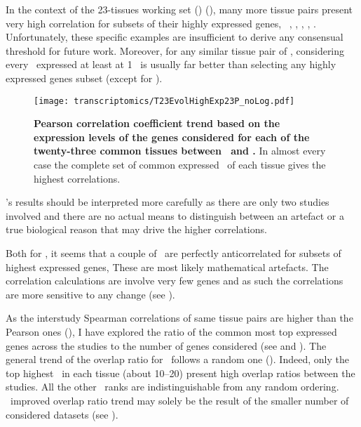 In the context of the 23-tissues working set (\setTwo) (),
many more tissue pairs present very high correlation for subsets of their highly
expressed genes, \ie\ \skeletal, \Thyroid, \Cortex, \Uterus, \Kidney.
Unfortunately, these specific examples are insufficient
to derive any consensual threshold for future work.
Moreover,
for any similar tissue pair of \setTwo,
considering every \pcg\ expressed at least at 1 \FPKM\ is usually
far better than selecting any highly expressed genes subset
(except for \kidney).\mybr\

\begin{figure}[!htpb]
    \texttt{[image: transcriptomics/T23EvolHighExp23P\_noLog.pdf]}\centering
    \vspace{-3mm}
    \caption[Pearson correlation coefficient trend based on the expression
    levels of the genes considered for each of the 23 common tissues]{%
\label{fig:CorHighExp23T}\textbf{Pearson correlation coefficient trend based
on the expression levels of the genes considered
for each of the twenty-three common tissues between \uhlen\ and \gtex.}
In almost every case the complete set of common expressed \pcgs\ of each tissue gives
the highest correlations.}
\end{figure}

\setTwo{}'s results should be interpreted more carefully as
there are only two studies involved and
there are no actual means to distinguish
between an artefact or a true biological reason
that may drive the higher correlations.\mybr\

Both for ,
it seems that a couple of \treps\ are perfectly anticorrelated
for subsets of highest expressed genes,
These are most likely mathematical artefacts.
The correlation calculations are involve very few genes
and as such the correlations are more sensitive to any change
(see ).\mybr\

As the interstudy Spearman correlations of same tissue pairs
are higher than the Pearson ones (),
I have explored the ratio of the common most top expressed
genes across the studies to the number of genes considered
(see  and ).
The general trend of the overlap ratio for \setOne\ follows a random one
().
Indeed, only the top highest \pcgs\ in each tissue (about 10--20)
present high overlap ratios between the studies.
All the other \pcg\ ranks are indistinguishable from any random ordering.
\setTwo\ improved overlap ratio trend may solely be
the result of the smaller number of considered datasets
(see ).\mybr\

